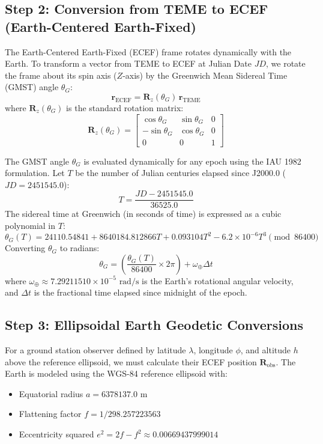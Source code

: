 \documentclass[11pt,journal,onecolumn]{IEEEtran}
\begin{document}
\subsection{Step 2: Conversion from TEME to ECEF (Earth-Centered Earth-Fixed)}
The Earth-Centered Earth-Fixed (ECEF) frame rotates dynamically with the Earth. To transform a vector from TEME to ECEF at Julian Date $JD$, we rotate the frame about its spin axis ($Z$-axis) by the Greenwich Mean Sidereal Time (GMST) angle $\theta_G$:
\begin{equation}
\mathbf{r}_{\text{ECEF}} = \mathbf{R}_z(\theta_G) \, \mathbf{r}_{\text{TEME}}
\label{eq:teme_to_ecef}
\end{equation}
where $\mathbf{R}_z(\theta_G)$ is the standard rotation matrix:
\begin{equation}
\mathbf{R}_z(\theta_G) = \begin{bmatrix}
\cos\theta_G & \sin\theta_G & 0 \\
-\sin\theta_G & \cos\theta_G & 0 \\
0 & 0 & 1
\end{bmatrix}
\label{eq:rotation_matrix}
\end{equation}

The GMST angle $\theta_G$ is evaluated dynamically for any epoch using the IAU 1982 formulation. Let $T$ be the number of Julian centuries elapsed since J2000.0 ($JD = 2451545.0$):
\begin{equation}
T = \frac{JD - 2451545.0}{36525.0}
\label{eq:julian_centuries}
\end{equation}
The sidereal time at Greenwich (in seconds of time) is expressed as a cubic polynomial in $T$:
\begin{equation}
\theta_G(T) = 24110.54841 + 8640184.812866 T + 0.093104 T^2 - 6.2 \times 10^{-6} T^3 \pmod{86400}
\label{eq:gmst_sec}
\end{equation}
Converting $\theta_G$ to radians:
\begin{equation}
\theta_G = \left( \frac{\theta_G(T)}{86400} \times 2\pi \right) + \omega_{\oplus} \Delta t
\label{eq:gmst_rad}
\end{equation}
where $\omega_{\oplus} \approx 7.29211510 \times 10^{-5}\text{ rad/s}$ is the Earth's rotational angular velocity, and $\Delta t$ is the fractional time elapsed since midnight of the epoch.

\subsection{Step 3: Ellipsoidal Earth Geodetic Conversions}
For a ground station observer defined by latitude $\lambda$, longitude $\phi$, and altitude $h$ above the reference ellipsoid, we must calculate their ECEF position $\mathbf{R}_{\text{obs}}$. The Earth is modeled using the WGS-84 reference ellipsoid with:
\begin{itemize}
    \item Equatorial radius $a = 6378137.0\text{ m}$
    \item Flattening factor $f = 1 / 298.257223563$
    \item Eccentricity squared $e^2 = 2f - f^2 \approx 0.00669437999014$
\end{itemize}
\end{document}
